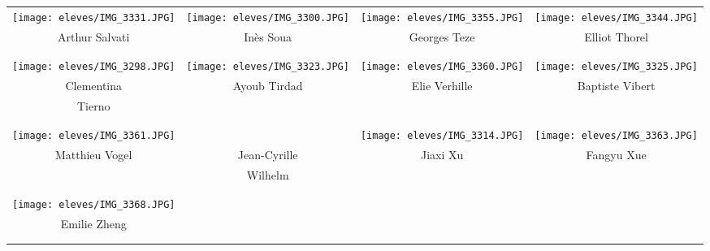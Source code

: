 \begin{center}
\begin{tabular}{cccc}
 \texttt{[image: eleves/IMG\_3331.JPG]} &
\texttt{[image: eleves/IMG\_3300.JPG]} &
\texttt{[image: eleves/IMG\_3355.JPG]} &
\texttt{[image: eleves/IMG\_3344.JPG]} \\
Arthur Salvati & Inès Soua & Georges Teze & Elliot Thorel \\ \\ \\ 

\texttt{[image: eleves/IMG\_3298.JPG]} &
\texttt{[image: eleves/IMG\_3323.JPG]} &
\texttt{[image: eleves/IMG\_3360.JPG]} &
\texttt{[image: eleves/IMG\_3325.JPG]} \\
Clementina & Ayoub Tirdad & Elie Verhille & Baptiste Vibert \\ Tierno \\ \\ \\ 

\texttt{[image: eleves/IMG\_3361.JPG]} &
&
\texttt{[image: eleves/IMG\_3314.JPG]} &
\texttt{[image: eleves/IMG\_3363.JPG]} \\
Matthieu Vogel & Jean-Cyrille & Jiaxi Xu & Fangyu Xue \\ & Wilhelm & &\\ \\ \\ 

\texttt{[image: eleves/IMG\_3368.JPG]} \\
Emilie Zheng  \\ \\ \\ 

\end{tabular}
\end{center}